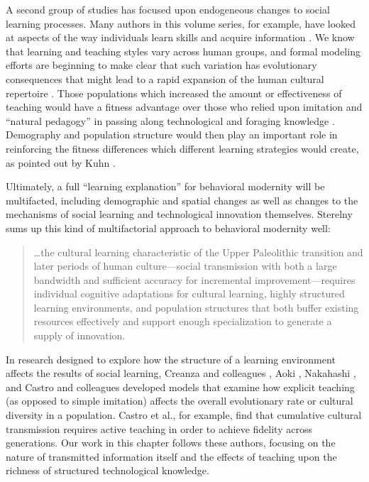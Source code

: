 A second group of studies has focused upon endogeneous changes to social
learning processes. Many authors in this volume series, for example,
have looked at aspects of the way individuals learn skills and acquire
information \citep{Aoki2013Determinants-of, Nishiaki2013Introduction}.
We know that learning and teaching styles vary across human groups, and
formal modeling efforts are beginning to make clear that such variation
has evolutionary consequences that might lead to a rapid expansion of
the human cultural repertoire \citep{Nakahashi2013Cultural-Evolut}.
Those populations which increased the amount or effectiveness of
teaching would have a fitness advantage over those who relied upon
imitation and ``natural pedagogy'' in passing along technological and
foraging knowledge
\citep{Csibra:2011dx, Fogarty:2011gv, Terashima2013The-Evolutionar}.
Demography and population structure would then play an important role in
reinforcing the fitness differences which different learning strategies
would create, as pointed out by Kuhn
\citeyearpar{Kuhn2013Cultural-Transm}.

Ultimately, a full ``learning explanation'' for behavioral modernity
will be multifacted, including demographic and spatial changes as well
as changes to the mechanisms of social learning and technological
innovation themselves. Sterelny \citeyearpar[p.61]{sterelny2012evolved}
sums up this kind of multifactorial approach to behavioral modernity
well:

\begin{quote}
\ldots{}the cultural learning characteristic of the Upper Paleolithic
transition and later periods of human culture---social transmission with
both a large bandwidth and sufficient accuracy for incremental
improvement---requires individual cognitive adaptations for cultural
learning, highly structured learning environments, and population
structures that both buffer existing resources effectively and support
enough specialization to generate a supply of innovation.
\end{quote}

In research designed to explore how the structure of a learning
environment affects the results of social learning, Creanza and
colleagues \citeyearpar{Creanza2013Exploring-Cultu}, Aoki
\citeyearpar{Aoki2013Determinants-of}, Nakahashi
\citeyearpar{Nakahashi2013Cultural-Evolut}, and Castro and colleagues
\citeyearpar{Castro201474} developed models that examine how explicit
teaching (as opposed to simple imitation) affects the overall
evolutionary rate or cultural diversity in a population. Castro et al.,
for example, find that cumulative cultural transmission requires active
teaching in order to achieve fidelity across generations. Our work in
this chapter follows these authors, focusing on the nature of
transmitted information itself and the effects of teaching upon the
richness of structured technological knowledge.

